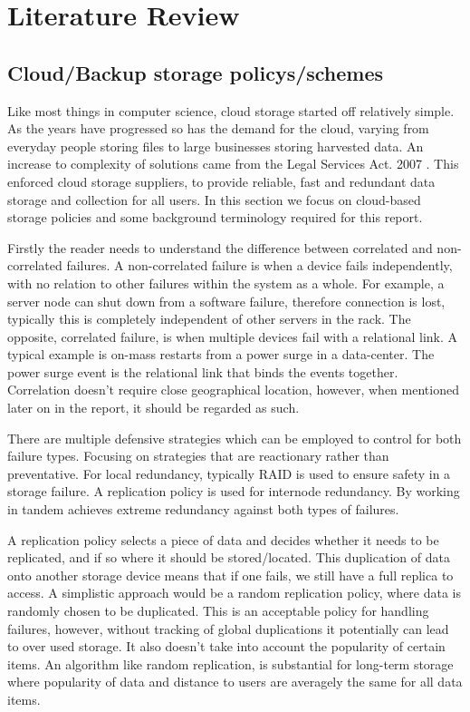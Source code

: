 \documentclass{UoYCSproject}
\begin{document}
\chapter{Literature Review}
\label{cha:Litreture Review}

\section{Cloud/Backup storage policys/schemes}
\label{sec:Cloud}

Like most things in computer science, cloud storage started off relatively simple.
As the years have progressed so has the demand for the cloud, varying from everyday people storing files to large businesses storing harvested data.
An increase to complexity of solutions came from the Legal Services Act. 2007 \cite{LSA}.
This enforced cloud storage suppliers, to provide reliable, fast and redundant data storage and collection for all users.
In this section we focus on cloud-based storage policies and some background terminology required for this report.

Firstly the reader needs to understand the difference between correlated and non-correlated failures.
A non-correlated failure is when a device fails independently, with no relation to other failures within the system as a whole.
For example, a server node can shut down from a software failure, therefore connection is lost, typically this is completely independent of other servers in the rack.
The opposite, correlated failure, is when multiple devices fail with a relational link.
A typical example is on-mass restarts from a power surge in a data-center.
The power surge event is the relational link that binds the events together.
Correlation doesn't require close geographical location, however, when mentioned later on in the report, it should be regarded as such.

There are multiple defensive strategies which can be employed to control for both failure types.
Focusing on strategies that are reactionary rather than preventative.
For local redundancy, typically RAID is used to ensure safety in a storage failure.
A replication policy \cite{Avalability storage} is used for internode redundancy.
By working in tandem achieves extreme redundancy against both types of failures.

A replication policy selects a piece of data and decides whether it needs to be replicated, and if so where it should be stored/located.
This duplication of data onto another storage device means that if one fails, we still have a full replica to access.
A simplistic approach would be a random replication policy, where data is randomly chosen to be duplicated.
This is an acceptable policy for handling failures, however, without tracking of global duplications it potentially can lead to over used storage.
It also doesn’t take into account the popularity of certain items.
An algorithm like random replication, is substantial for long-term storage where popularity of data and distance to users are averagely the same for all data items.
\end{document}

